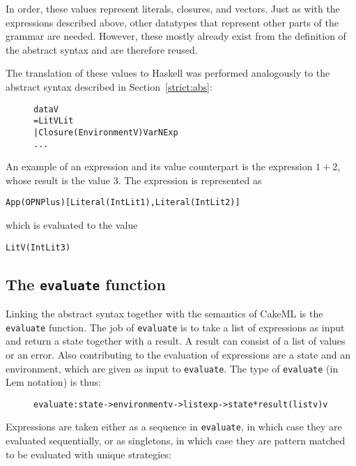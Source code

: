 \noindent In order, these values represent literals, closures, and vectors.
Just as with the expressions described above, other datatypes that represent
other parts of the grammar are needed. However, these mostly already exist from
the definition of the abstract syntax and are therefore reused.

The translation of these values to Haskell was performed analogously to the
abstract syntax described in Section~\ref{strict:abs}:

\begin{figure}[H]
\begin{alltt}
  data V
    = LitV Lit
    | Closure (Environment V) VarN Exp
    ...
\end{alltt}
\end{figure}

An example of an expression and its value counterpart is the expression $1 + 2$,
whose result is the value 3. The expression is represented as
\begin{alltt}
  App (OPN Plus) [Literal (IntLit 1), Literal (IntLit 2)]
\end{alltt}
which is evaluated to the value
\begin{alltt}
  LitV (IntLit 3)
\end{alltt}


\subsection{The \texttt{evaluate} function}
Linking the abstract syntax together with the semantics of CakeML is the
\texttt{evaluate} function. The job of \texttt{evaluate} is to take a list of
expressions as input and return a state together with a result. A result can
consist of a list of values or an error. Also contributing to the evaluation
of expressions are a state and an environment, which are given as input to
\texttt{evaluate}. The type of \texttt{evaluate} (in Lem notation) is thus:

\begin{figure}[H]
\begin{alltt}
  evaluate:state -> environment v -> list exp -> state*result (list v) v
\end{alltt}
\end{figure}

\noindent Expressions are taken either as a sequence in \texttt{evaluate},
in which case they are evaluated sequentially, or as singletons, in which case
they are pattern matched to be evaluated with unique strategies:

